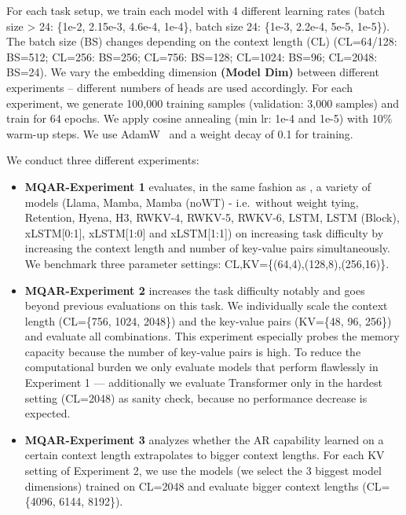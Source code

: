 \documentclass[dvipsnames]{article}
\begin{document}
\begin{appendix}
For each task setup, we train each model with 4 different learning rates (batch size > 24: \{1e-2, 2.15e-3, 4.6e-4, 1e-4\}, batch size 24: \{1e-3, 2.2e-4, 5e-5, 1e-5\}). The batch size (BS) changes depending 
on the context length (CL) (CL=64/128: BS=512; 
CL=256: BS=256; CL=756: BS=128; 
CL=1024: BS=96; CL=2048: BS=24). 
We vary the embedding dimension \textbf{(Model Dim)} between different experiments 
-- different numbers of heads are used accordingly.
For each experiment, we generate 100,000 training samples (validation: 3,000 samples) 
and train for 64 epochs. 
We apply cosine annealing (min lr: 1e-4 and 1e-5) with 10\% warm-up steps.
We use AdamW~\citep{Loshchilov:19} and a weight decay of 0.1 for training.

We conduct three different experiments:

\begin{itemize}
    \item\textbf{MQAR-Experiment 1} evaluates, in the same fashion as \citet{Arora:23arxiv}, a variety of models (Llama, Mamba, Mamba (noWT) - i.e.\ without weight tying, Retention, Hyena, H3, RWKV-4, RWKV-5, RWKV-6, LSTM, LSTM (Block), xLSTM[0:1], xLSTM[1:0] and xLSTM[1:1]) on increasing task difficulty by increasing the context length and number of key-value pairs simultaneously. We benchmark three parameter settings: CL,KV=\{(64,4),(128,8),(256,16)\}.
    
    \item\textbf{MQAR-Experiment 2} increases the task difficulty notably and goes beyond 
    previous evaluations on this task. 
    We individually scale the context length (CL=\{756, 1024, 2048\})
    and the key-value pairs (KV=\{48, 96, 256\}) and evaluate all combinations.
    This experiment especially probes the memory capacity because the number of key-value pairs is high.
    To reduce the computational burden we only evaluate models that perform flawlessly in Experiment 1 --- 
    additionally we evaluate Transformer only in the hardest setting (CL=2048) as sanity check, 
    because no performance decrease is expected.
    
    \item\textbf{MQAR-Experiment 3} analyzes whether the AR capability learned 
    on a certain context length extrapolates to bigger context lengths. 
    For each KV setting of Experiment 2, we use the models 
    (we select the 3 biggest model dimensions) trained on CL=2048 and
    evaluate bigger context lengths (CL=\{4096, 6144, 8192\}).
\end{itemize}


\end{appendix}
\end{document}
